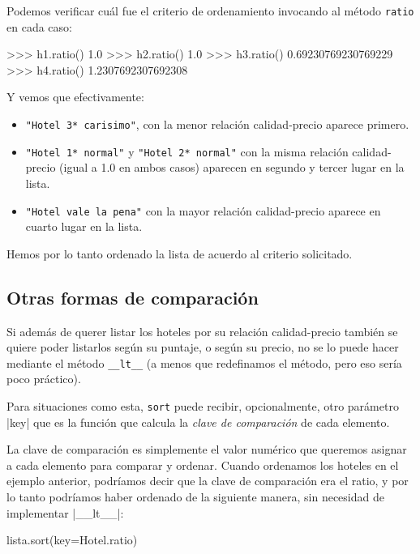 Podemos verificar cuál fue el criterio de ordenamiento invocando al
método \lstinline!ratio! en cada caso:

\begin{codigo-python-sn}
>>> h1.ratio()
1.0
>>> h2.ratio()
1.0
>>> h3.ratio()
0.69230769230769229
>>> h4.ratio()
1.2307692307692308
\end{codigo-python-sn}

Y vemos que efectivamente:

\begin{itemize}
\item \verb!"Hotel 3* carisimo"!, con la menor relación calidad-precio
aparece primero.

\item \verb!"Hotel 1* normal"! y \verb!"Hotel 2* normal"! con la misma relación
calidad-precio (igual a 1.0 en ambos casos) aparecen en segundo
y tercer lugar en la lista.

\item \verb!"Hotel vale la pena"! con la mayor relación calidad-precio
aparece en cuarto lugar en la lista.
\end{itemize}

Hemos por lo tanto ordenado la lista de acuerdo al criterio solicitado.

\subsection{Otras formas de comparación}

Si además de querer listar los hoteles por su relación calidad-precio
también se quiere poder listarlos según su puntaje, o según su precio, no
se lo puede hacer mediante el método \lstinline!__lt__! (a menos que
redefinamos el método, pero eso sería poco práctico).

Para situaciones como esta, \lstinline!sort! puede recibir, opcionalmente,
otro parámetro |key| que es la función que calcula la \emph{clave de comparación}
de cada elemento.

La clave de comparación es simplemente el valor numérico que queremos asignar a
cada elemento para comparar y ordenar. Cuando ordenamos los hoteles en el
ejemplo anterior, podríamos decir que la clave de comparación era el ratio, y
por lo tanto podríamos haber ordenado de la siguiente manera, sin necesidad de
implementar |__lt__|:

\begin{codigo-python-sn}
lista.sort(key=Hotel.ratio)
\end{codigo-python-sn}

